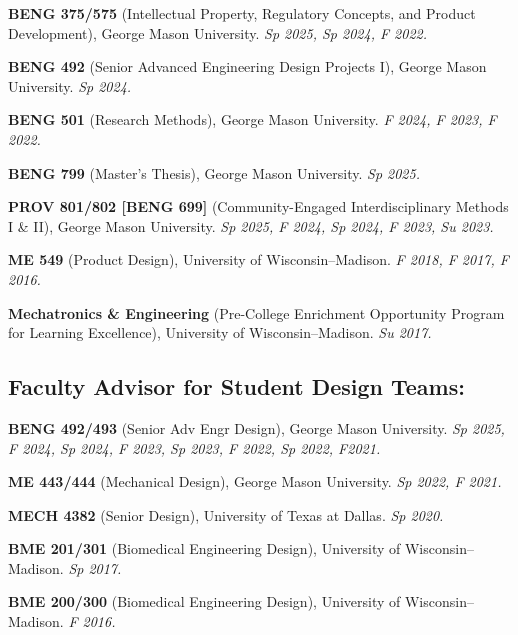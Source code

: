 \documentclass[letterpaper, 10pt]{article}
\begin{document}
\begin{compactitem}
     \item \textbf{BENG 375/575} (Intellectual Property, Regulatory Concepts, and Product Development), George Mason University. \textit{Sp 2025, Sp 2024, F 2022.}
     \item \textbf{BENG 492} (Senior Advanced Engineering Design Projects I), George Mason University. \textit{Sp 2024.}
     \item \textbf{BENG 501} (Research Methods), George Mason University. \textit{F 2024, F 2023, F 2022.}
     \item \textbf{BENG 799} (Master's Thesis), George Mason University. \textit{Sp 2025.}
     \item \textbf{PROV 801/802 [BENG 699]} (Community-Engaged Interdisciplinary Methods I \& II), George Mason University. \textit{Sp 2025, F 2024, Sp 2024, F 2023, Su 2023.}
     \item \textbf{ME 549} (Product Design), University of Wisconsin--Madison. \textit{F 2018, F 2017, F 2016.}
     \item \textbf{Mechatronics \& Engineering} (Pre-College Enrichment Opportunity Program for Learning Excellence), University of Wisconsin--Madison. \textit{Su 2017.}
\end{compactitem}

\subsection{Faculty Advisor for Student Design Teams:}
\begin{compactitem}
     \item \textbf{BENG 492/493} (Senior Adv Engr Design), George Mason University. \textit{Sp 2025, F 2024, Sp 2024, F 2023, Sp 2023, F 2022, Sp 2022, F2021.}
     \item \textbf{ME 443/444} (Mechanical Design), George Mason University. \textit{Sp 2022, F 2021.}
     \item \textbf{MECH 4382} (Senior Design), University of Texas at Dallas. \textit{Sp 2020.}
     \item \textbf{BME 201/301} (Biomedical Engineering Design), University of Wisconsin--Madison. \textit{Sp 2017.}
     \item \textbf{BME 200/300} (Biomedical Engineering Design), University of Wisconsin--Madison. \textit{F 2016.}
\end{compactitem}
\end{document}
